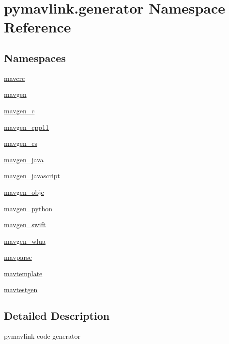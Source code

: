 \hypertarget{namespacepymavlink_1_1generator}{}\section{pymavlink.\+generator Namespace Reference}
\label{namespacepymavlink_1_1generator}
\subsection*{Namespaces}
\begin{DoxyCompactItemize}
\item 
 \hyperlink{namespacepymavlink_1_1generator_1_1mavcrc}{mavcrc}
\item 
 \hyperlink{namespacepymavlink_1_1generator_1_1mavgen}{mavgen}
\item 
 \hyperlink{namespacepymavlink_1_1generator_1_1mavgen__c}{mavgen\+\_\+c}
\item 
 \hyperlink{namespacepymavlink_1_1generator_1_1mavgen__cpp11}{mavgen\+\_\+cpp11}
\item 
 \hyperlink{namespacepymavlink_1_1generator_1_1mavgen__cs}{mavgen\+\_\+cs}
\item 
 \hyperlink{namespacepymavlink_1_1generator_1_1mavgen__java}{mavgen\+\_\+java}
\item 
 \hyperlink{namespacepymavlink_1_1generator_1_1mavgen__javascript}{mavgen\+\_\+javascript}
\item 
 \hyperlink{namespacepymavlink_1_1generator_1_1mavgen__objc}{mavgen\+\_\+objc}
\item 
 \hyperlink{namespacepymavlink_1_1generator_1_1mavgen__python}{mavgen\+\_\+python}
\item 
 \hyperlink{namespacepymavlink_1_1generator_1_1mavgen__swift}{mavgen\+\_\+swift}
\item 
 \hyperlink{namespacepymavlink_1_1generator_1_1mavgen__wlua}{mavgen\+\_\+wlua}
\item 
 \hyperlink{namespacepymavlink_1_1generator_1_1mavparse}{mavparse}
\item 
 \hyperlink{namespacepymavlink_1_1generator_1_1mavtemplate}{mavtemplate}
\item 
 \hyperlink{namespacepymavlink_1_1generator_1_1mavtestgen}{mavtestgen}
\end{DoxyCompactItemize}


\subsection{Detailed Description}
\begin{DoxyVerb}pymavlink code generator\end{DoxyVerb}
 